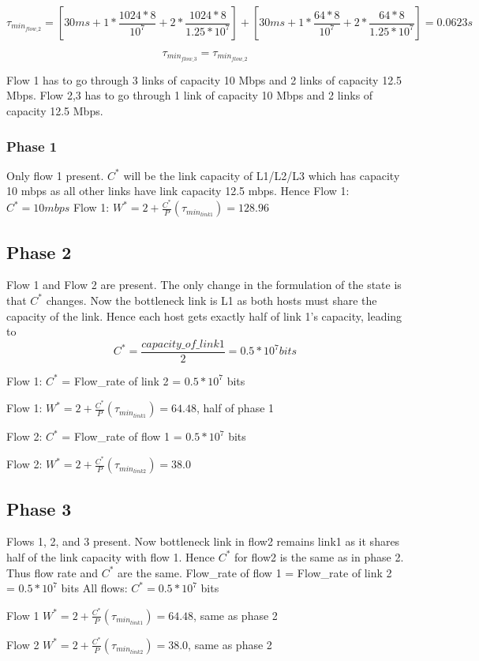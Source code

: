 \documentclass[12pt]{article}
\begin{document}
$$\tau_{min_{flow\_2}} = [30 ms + 1*\frac{1024*8}{10^7} + 2*\frac{1024*8}{1.25*10^7}] + [30 ms + 1*\frac{64*8}{10^7} + 2*\frac{64*8}{1.25*10^7}] = 0.0623 s$$ 

$$\tau_{min_{flow\_3}} = \tau_{min_{flow\_2}}$$

Flow 1 has to go through 3 links of capacity 10 Mbps and 2 links of capacity 12.5 Mbps.
Flow 2,3 has to go through 1 link of capacity 10 Mbps and 2 links of capacity 12.5 Mbps.


\subsubsection*{Phase 1}
Only flow 1 present. $C^*$ will be the link capacity of L1/L2/L3 which has capacity 10 mbps as all other links have link capacity 12.5 mbps. Hence 
Flow 1: $C^* = 10 mbps$
Flow 1: $W^* = 2 + \frac{C^*}{P}(\tau_{min_{link1}})=128.96 $

\subsection*{Phase 2}
Flow 1 and Flow 2 are present. The only change in the formulation of the state is that $C^*$ changes. Now the bottleneck link is L1 as both hosts must share the capacity of the link. Hence each host gets exactly half of link 1's capacity, leading to $$ C^* = \frac{capacity\_of\_link1}{2} = 0.5*10^7 bits $$

Flow 1: $C^*$ = Flow\_rate of link 2 = $0.5*10^7$ bits

Flow 1: $W^* = 2+\frac{C^*}{P}(\tau_{min_{link1}}) = 64.48$, half of phase 1

Flow 2: $C^*$ = Flow\_rate of flow 1 = $0.5*10^7$ bits

Flow 2: $W^* = 2+\frac{C^*}{P}(\tau_{min_{link2}}) = 38.0$


\subsection*{Phase 3}
Flows 1, 2, and 3 present. Now bottleneck link in flow2 remains link1 as it shares half of the link capacity with flow 1. Hence $C^*$ for flow2 is the same as in phase 2. Thus flow rate and $C^*$ are the same.
Flow\_rate of flow 1 = Flow\_rate of link 2 = $0.5*10^7$ bits
All flows: $C^* = 0.5*10^7$ bits

Flow 1 $W^* = 2+\frac{C^*}{P}(\tau_{min_{link1}}) = 64.48$, same as phase 2

Flow 2 $W^* = 2+\frac{C^*}{P}(\tau_{min_{link2}}) = 38.0$, same as phase 2
\end{document}
